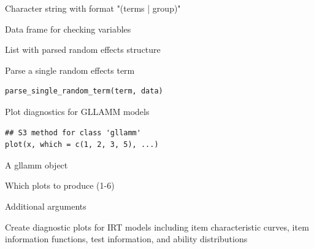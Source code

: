 \documentclass[a4paper]{book}
\begin{document}
%
\begin{Arguments}
\begin{ldescription}
\item[\code{term}] Character string with format "(terms | group)"

\item[\code{data}] Data frame for checking variables
\end{ldescription}
\end{Arguments}
%
\begin{Value}
List with parsed random effects structure
\end{Value}
%
\begin{Description}
Parse a single random effects term
\end{Description}
%
\begin{Usage}
\begin{verbatim}
parse_single_random_term(term, data)
\end{verbatim}
\end{Usage}
%
\begin{Description}
Plot diagnostics for GLLAMM models
\end{Description}
%
\begin{Usage}
\begin{verbatim}
## S3 method for class 'gllamm'
plot(x, which = c(1, 2, 3, 5), ...)
\end{verbatim}
\end{Usage}
%
\begin{Arguments}
\begin{ldescription}
\item[\code{x}] A gllamm object

\item[\code{which}] Which plots to produce (1-6)

\item[\code{...}] Additional arguments
\end{ldescription}
\end{Arguments}
%
\begin{Description}
Create diagnostic plots for IRT models including item characteristic curves,
item information functions, test information, and ability distributions
\end{Description}
\end{document}
